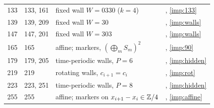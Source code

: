 \begin{table}[!htbp]
\begin{tabular}{rlll}
133 & 133, 161 & fixed wall $W=0330$ ($k=4$) & \cite{PaperC}, \eqref{imp:133}\\
139 & 139, 209 & fixed wall $W=30$ & \cite{PaperC}, \eqref{imp:walls}\\
147 & 147, 201 & fixed wall $W=303$ & \cite{PaperC}, \eqref{imp:walls}\\
165 & 165 & affine; markers, $(\bigoplus_mS_m)^2$ & \cite{PaperC}, \eqref{imp:90}\\
179 & 179, 205 & time-periodic walls, $P=6$ & \cite{PaperC}, \eqref{imp:hidden}\\
219 & 219 & rotating walls, $c_{i+1}=c_i$ & \cite{PaperC}, \eqref{imp:rot}\\
223 & 223, 251 & time-periodic walls, $P=8$ & \cite{PaperC}, \eqref{imp:hidden}\\
255 & 255 & affine; markers on $x_{i+1}-x_i\in\mathbb{Z}/4$ & \cite{PaperC}, \eqref{imp:affine}\\
\bottomrule
\end{tabular}
\end{table}

